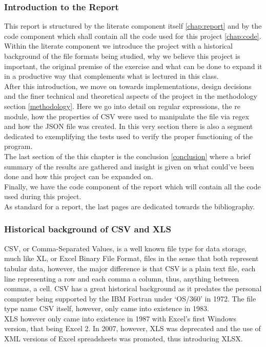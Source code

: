 \documentclass[11pt,a4paper,times]{report}
\def\CSV{Comma-Separated Values\xspace}
\def\XLS{Excel Binary File Format\xspace}
\begin{document}
\subsubsection*{Introduction to the Report} This report is structured by 
the literate component itself \ref{chap:report} and by the code component
which shall contain all the code used for this project \ref{chap:code}.
\\
Within the literate component we introduce the project with a historical
background of the file formats being studied, why we believe this project
is important, the original premise of the exercise and what can be
done to expand it in a productive way that complements what is lectured
in this class.
\\
After this introduction, we move on towards implementations, design 
decisions and the finer technical and theoretical aspects of the project
in the methodology section \ref{methodology}. Here we go into detail on 
regular expressions, the re module, how the properties of CSV were used
to manipulate the file via regex and how the JSON file was created.
In this very section there is also a segment dedicated to exemplifying 
the tests used to verify the proper functioning of the program.
\\
The last section of the this chapter is the conclusion \ref{conclusion}
where a brief summary of the results are gathered and insight is given on
what could've been done and how this project can be expanded on.
\\
Finally, we have the code component of the report which will contain all
the code used during this project.
\\
As standard for a report, the last pages are dedicated towards the
bibliography.

\subsubsection*{Historical background of CSV and XLS}CSV, or \CSV, is a
well known file type for data storage, much like XL, or \XLS, files in 
the sense that both represent tabular data, however, the major difference
is that CSV is a plain text file, each line representing a row and each 
comma a column, thus, anything between commas, a cell. CSV has a great 
historical background as it predates the personal computer being 
supported by the IBM Fortran under `OS/360' in 1972. \cite{FORTRANCSV}
The file type name CSV itself, however, only came into existence in 1983.
\\
XLS however only came into existence in 1987 with Excel's first Windows 
version, that being Excel 2. \cite{EXCELOR} In 2007, however, XLS was deprecated and the
use of XML versions of Excel spreadsheets was promoted, thus
introducing XLSX.
\end{document}
